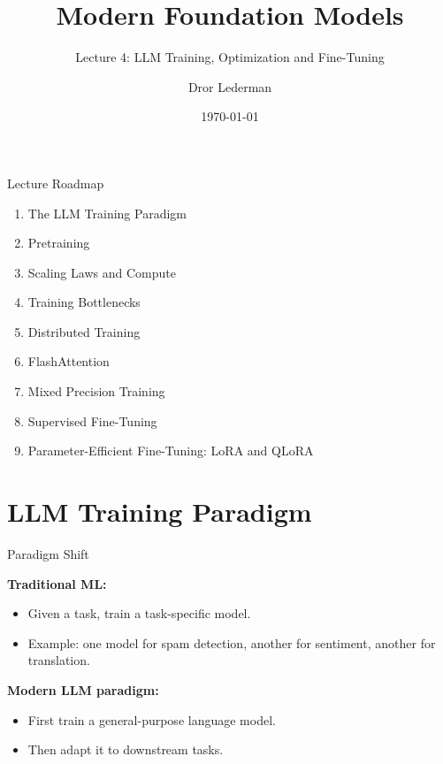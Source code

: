 \documentclass[aspectratio=169]{beamer}
\title{Modern Foundation Models}
\subtitle{Lecture 4: LLM Training, Optimization and Fine-Tuning}
\author{Dror Lederman}
\institute{Holon Institute of Technology}
\date{\today}
\begin{document}
\begin{frame}
\titlepage
\end{frame}

\begin{frame}{Lecture Roadmap}
\begin{enumerate}
    \item The LLM Training Paradigm
    \item Pretraining
    \item Scaling Laws and Compute
    \item Training Bottlenecks
    \item Distributed Training
    \item FlashAttention
    \item Mixed Precision Training
    \item Supervised Fine-Tuning
    \item Parameter-Efficient Fine-Tuning: LoRA and QLoRA
\end{enumerate}
\end{frame}

\section{LLM Training Paradigm}

\begin{frame}{Paradigm Shift}

\textbf{Traditional ML:}

\begin{itemize}
    \item Given a task, train a task-specific model.
    \item Example: one model for spam detection, another for sentiment, another for translation.
\end{itemize}

\vspace{0.5cm}

\textbf{Modern LLM paradigm:}

\begin{itemize}
    \item First train a general-purpose language model.
    \item Then adapt it to downstream tasks.
\end{itemize}

\end{frame}
\end{document}
